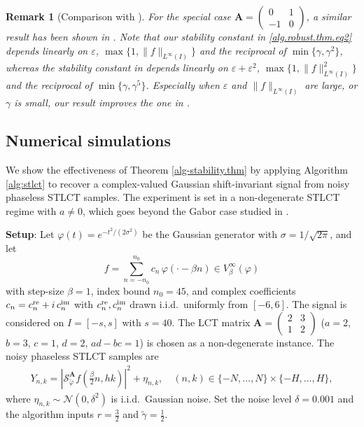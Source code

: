 \documentclass[11pt, reqno]{amsart}
\newtheorem{remark}[theorem]{Remark}%
\numberwithin{equation}{section}
\begin{document}
\begin{remark}[Comparison with \cite{grohs2024stable}]
    For the special case $\mathbf{A} = \begin{pmatrix} 0 & 1 \\ -1 & 0 \end{pmatrix}$, a similar result has been shown in \cite[Theorem 4.6]{grohs2024stable}. Note that our stability constant in \eqref{alg.robust.thm.eq2} depends linearly on $\varepsilon$, $\max\{1,\|f\|_{L^{\infty}(I)}\}$ and the reciprocal of $\min \{\gamma, \gamma^2\}$, whereas the stability constant in \cite[Eq.(48)]{grohs2024stable} depends linearly on $\varepsilon+\varepsilon^2$, $\max\{1, \|f\|_{L^{\infty}(I)}^2\}$ and the reciprocal of $\min \{\gamma, \gamma^5\}$. Especially when $\varepsilon$ and $\|f\|_{L^{\infty} (I)}$ are large, or $\gamma$ is small, our result improves the one in \cite{grohs2024stable}.
\end{remark}
	

\subsection{Numerical simulations}

We show the effectiveness of  Theorem \ref{alg-stability.thm} by applying Algorithm \ref{alg:stlct} to recover a complex-valued Gaussian shift-invariant signal from noisy phaseless STLCT samples. The experiment is set in a non-degenerate STLCT regime with $a \ne 0$, which goes beyond the Gabor case studied in \cite{grohs2024stable}. 




\medskip
\noindent\textbf{Setup}: Let $\varphi(t) = e^{-t^2/(2\sigma^2)}$ be the Gaussian generator with $\sigma = 1/\sqrt{2\pi}$, and let
\[
f = \sum_{n=-n_0}^{n_0} c_n\,\varphi(\cdot - \beta n) \in V_\beta^\infty(\varphi)
\]
with step-size $\beta=1$, index bound $n_0=45$, and complex coefficients $c_n = c_n^{\rm re} + i\,c_n^{\rm im}$ with $c_n^{\rm re}, c_n^{\rm im}$ drawn i.i.d.\ uniformly from $[-6,6]$. The signal is considered on $I = [-s, s]$ with $s=40$. The LCT matrix $\mathbf{A} = \begin{pmatrix} 2 & 3 \\ 1 & 2 \end{pmatrix}$ ($a=2$, $b=3$, $c=1$, $d=2$, $ad-bc=1$) is chosen as a  non-degenerate instance. 
The noisy phaseless STLCT samples are
\begin{align}\label{gaussnoise.data.def}
		Y_{n,k} = |\mathcal{S}_{\check{\varphi}}^{\mathbf{A}} f (\frac{\beta}{2} n , hk)|^2 + \eta_{n, k}, \quad (n,k) \in \{ -N, \dots, N \} \times \{ -H, \dots, H \},
\end{align}
where $\eta_{n,k}\sim \mathcal{N}(0,\delta^2)$ is i.i.d.\ Gaussian noise.
Set the noise level $\delta = 0.001$ and the  algorithm inputs  $r = \frac32$ and $\tilde{\gamma} = \frac12$.
\end{document}
